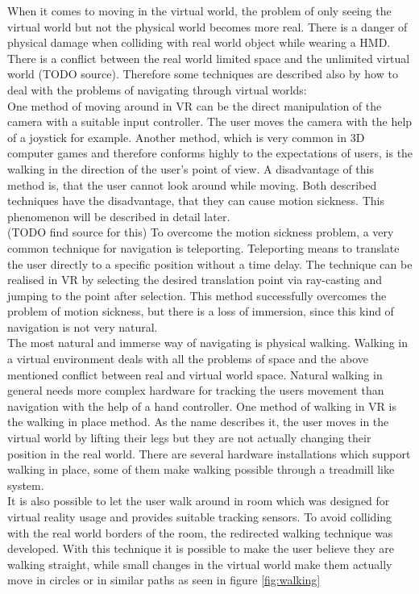 When it comes to moving in the virtual world, the problem of only seeing the virtual world but not the physical world becomes more real. There is a danger of physical damage when colliding with real world object while wearing a HMD. There is a conflict between the real world limited space and the unlimited virtual world (TODO source). Therefore some techniques are described also by \cite{Dorner.2013} how to deal with the problems of navigating through virtual worlds:\\
One method of moving around in VR can be the direct manipulation of the camera with a suitable input controller. The user moves the camera with the help of a joystick for example. Another method, which is very common in 3D computer games and therefore conforms highly to the expectations of users, is the walking in the direction of the user's point of view. A disadvantage of this method is, that the user cannot look around while moving. Both described techniques have the disadvantage, that they can cause motion sickness. This phenomenon will be described in detail later.\\
(TODO find source for this) To overcome the motion sickness problem, a very common technique for navigation is teleporting. Teleporting means to translate the user directly to a specific position without a time delay. The technique can be realised in VR by selecting the desired translation point via ray-casting and jumping to the point after selection. This method successfully overcomes the problem of motion sickness, but there is a loss of immersion, since this kind of navigation is not very natural.  \\
The most natural and immerse way of navigating is physical walking. Walking in a virtual environment deals with all the problems of space and the above mentioned conflict between real and virtual world space. Natural walking in general needs more complex hardware for tracking the users movement than navigation with the help of a hand controller. One method of walking in VR is the walking in place method. As the name describes it, the user moves in the virtual world by lifting their legs but they are not actually changing their position in the real world. There are several hardware installations which support walking in place, some of them make walking possible through a treadmill like system.\\
It is also possible to let the user walk around in room which was designed for virtual reality usage and provides suitable tracking sensors. To avoid colliding with the real world borders of the room, the redirected walking technique was developed. With this technique it is possible to make the user believe they are walking straight, while small changes in the virtual world make them actually move in circles or in similar paths as seen in figure \ref{fig:walking}
